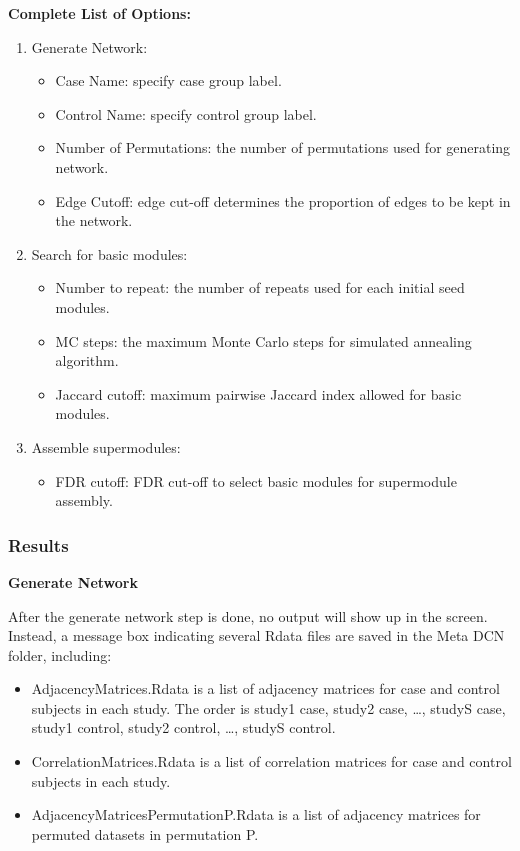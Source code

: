 \textbf{Complete List of Options:} 
\begin{enumerate}
\item Generate Network:
\begin{itemize}
\item Case Name: specify case group label.
\item Control Name: specify control group label.
\item Number of Permutations: the number of permutations used for generating network.
\item Edge Cutoff: edge cut-off  determines the proportion of edges to be kept in the network.
\end{itemize}

\item Search for basic modules:
\begin{itemize}
\item Number to repeat:  the number of repeats used for each initial seed modules.
\item MC steps:  the maximum Monte Carlo steps for simulated annealing algorithm.
\item Jaccard cutoff: maximum pairwise Jaccard index allowed for basic modules.
\end{itemize}
\item Assemble supermodules:

\begin{itemize}
\item FDR cutoff:  FDR cut-off to select basic modules for supermodule assembly.
\end{itemize}

\end{enumerate}

\subsubsection{Results}

\textbf{Generate Network}

After the generate network step is done, no output will show up in the screen. Instead, a message box indicating several Rdata files are saved in the Meta DCN folder, including:

\begin{itemize}
\item AdjacencyMatrices.Rdata is a list of adjacency matrices for case and control subjects in each study. The order is study1 case, study2 case, \dots, studyS case, study1 control, study2 control, \dots, studyS control.
\item CorrelationMatrices.Rdata is a list of correlation matrices for case and control subjects in each study.
\item AdjacencyMatricesPermutationP.Rdata is a list of adjacency matrices for permuted datasets in permutation P.
\end{itemize}

